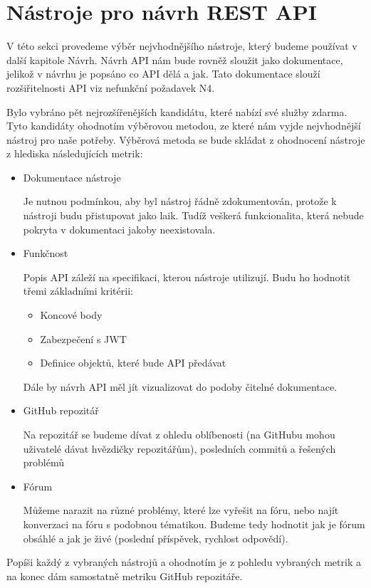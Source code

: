\documentclass[thesis=B,czech]{FITthesis}[2012/06/26]
\begin{document}
    \section{Nástroje pro návrh REST API}
        V této sekci provedeme výběr nejvhodnějšího nástroje, který budeme používat v další kapitole Návrh.
        Návrh API nám bude rovněž sloužit jako dokumentace, jelikož v návrhu je popsáno co API dělá a jak. Tato dokumentace slouží rozšiřitelnosti API viz nefunkční požadavek N4.
        
        Bylo vybráno pět nejrozšířenějších kandidátu, které nabízí své služby zdarma. Tyto kandidáty ohodnotím výběrovou metodou, ze které nám vyjde nejvhodnější nástroj pro naše potřeby.
		Výběrová metoda se bude skládat z ohodnocení nástroje z hlediska následujících metrik:
        \begin{itemize}
            \item Dokumentace nástroje
            
            	Je nutnou podmínkou, aby byl nástroj řádně zdokumentován, protože k nástroji budu přistupovat jako laik. Tudíž veškerá funkcionalita, která nebude pokryta v dokumentaci jakoby neexistovala.
            \item Funkčnost
           	
               	Popis API záleží na specifikaci, kterou nástroje utilizují. Budu ho hodnotit třemi základními kritérii:
       	        \begin{itemize}
               	    \item Koncové body
    		        \item Zabezpečení s JWT
    		        \item Definice objektů, které bude API předávat
        		\end{itemize}
    	        Dále by návrh API měl jít vizualizovat do podoby čitelné dokumentace.
            \item GitHub repozitář
            
                Na repozitář se budeme dívat z ohledu oblíbenosti (na GitHubu mohou uživatelé dávat hvězdičky repozitářům), posledních commitů a řešených problémů
            \item Fórum
            
                Můžeme narazit na různé problémy, které lze vyřešit na fóru, nebo najít konverzaci na fóru s podobnou tématikou. Budeme tedy hodnotit jak je fórum obsáhlé a jak je živé (poslední příspěvek, rychlost odpovědí).
        \end{itemize}
        Popíši každý z vybraných nástrojů a ohodnotím je z pohledu vybraných metrik a na konec dám samostatně metriku GitHub repozitáře.
\end{document}
